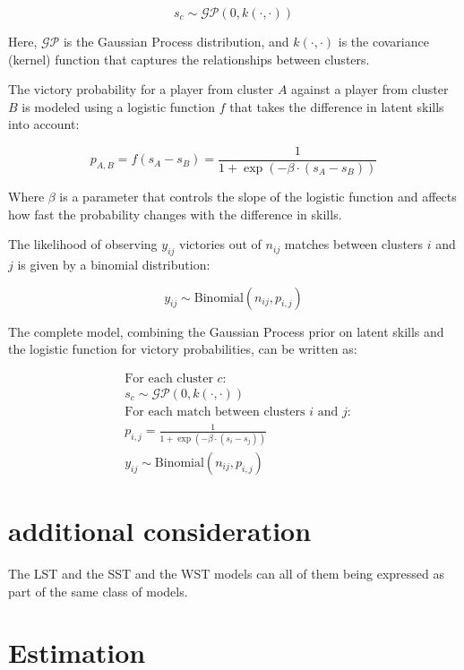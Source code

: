 \documentclass[11pt]{amsart}
\begin{document}
\[
s_c \sim \mathcal{GP}(0, k(\cdot, \cdot))
\]

Here, $\mathcal{GP}$ is the Gaussian Process distribution, and $k(\cdot, \cdot)$ is the covariance (kernel) function that captures the relationships between clusters.

The victory probability for a player from cluster $A$ against a player from cluster $B$ is modeled using a logistic function $f$ that takes the difference in latent skills into account:

\[
p_{A,B} = f(s_A - s_B) = \frac{1}{1 + \exp(-\beta \cdot (s_A - s_B))}
\]

Where $\beta$ is a parameter that controls the slope of the logistic function and affects how fast the probability changes with the difference in skills.

The likelihood of observing $y_{ij}$ victories out of $n_{ij}$ matches between clusters $i$ and $j$ is given by a binomial distribution:

\[
y_{ij} \sim \text{Binomial}(n_{ij}, p_{i,j})
\]

The complete model, combining the Gaussian Process prior on latent skills and the logistic function for victory probabilities, can be written as:

\begin{align*}
&\text{For each cluster } c: \\
&s_c \sim \mathcal{GP}(0, k(\cdot, \cdot)) \\
&\text{For each match between clusters } i \text{ and } j: \\
&p_{i,j} = \frac{1}{1 + \exp(-\beta \cdot (s_i - s_j))} \\
&y_{ij} \sim \text{Binomial}(n_{ij}, p_{i,j})
\end{align*}



\section{additional consideration}
The LST and the SST and the WST models can all of them being expressed as part of the same class of models.














\newpage



\clearpage
\section{Estimation}
\end{document}
